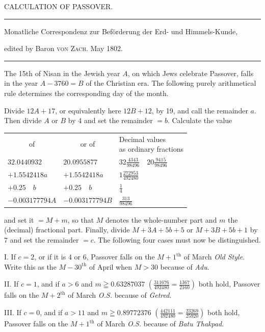 \clearpage{}%
\begin{center}
{\large CALCULATION OF PASSOVER.\par}
\medskip\hrule\medskip
{\small Monatliche Correspondenz zur Beförderung der Erd- und Himmels-Kunde,\par
edited by Baron \textsc{von Zach}. May 1802.\par}
\medskip\hrule
\end{center}\medskip
The 15th of Nisan in the Jewish year $A$, on which Jews celebrate Passover, falls in the year $A-3760=B$ of the Christian era. The following purely arithmetical rule determines the corresponding day of the month.

Divide $12A+17$, or equivalently here $12B+12$, by 19, and call the remainder $a$. Then divide $A$ or $B$ by 4 and set the remainder $=b$. Calculate the value
\begin{center}\small
\begin{tabular}{lll}
\multicolumn{1}{c}{of} & \multicolumn{1}{c}{or of} & \shortstack{Decimal values\\as ordinary fractions}\\[5pt]
$32.0440932$ & $20.0955877$ & $32\frac{4343}{98496}\quad20\frac{9415}{98496}$\\[5pt]
$+1.5542418a$ & $+1.5542418a$ & $1\frac{272953}{492480}$\\[5pt]
$+0.25\quad b$ & $+0.25\quad b$ & $\frac14$\\[5pt]
$-0.003177794A$ & $-0.003177794B$ & $\frac{313}{98496}$
\end{tabular}
\end{center}
and set it $=M+m$, so that $M$ denotes the whole-number part and $m$ the (decimal) fractional part. Finally, divide $M+3A+5b+5$ or $M+3B+5b+1$ by 7 and set the remainder $=c$. The following four cases must now be distinguished.

I. If $c=2$, or if it is 4 or 6, Passover falls on the $M+1^{\mathrm{th}}$ of March \textit{Old Style}. Write this as the $M-30^{\mathrm{th}}$ of April when $M>30$ because of \textit{Adu}.
%

II. If $c=1$, and if $a>6$ and $m\geqq0.63287037$
$(\frac{311676}{492480}=\frac{1367}{2160})$ both hold, Passover falls on the $M+2^{\mathrm{th}}$ of March \textit{O.S.} because of \textit{Getred}.

III. If $c=0$, and if $a>11$ and $m\geqq0.89772376$
$(\frac{442111}{492480}=\frac{23269}{25920})$ both hold, Passover falls on the $M+1^{\mathrm{th}}$ of March \textit{O.S.} because of \textit{Batu Thakpad}.

